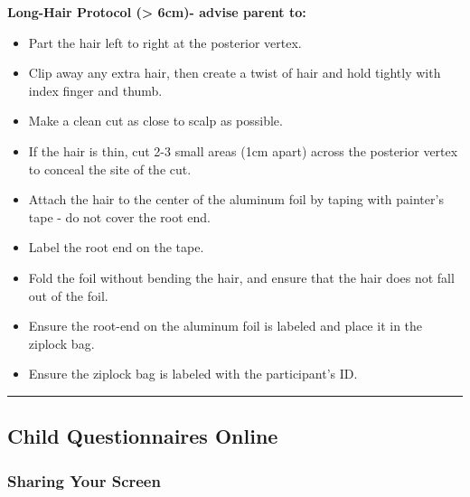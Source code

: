 \documentclass[]{book}
\providecommand{\tightlist}{%
  \setlength{\itemsep}{0pt}\setlength{\parskip}{0pt}}
\begin{document}
\textbf{Long-Hair Protocol (\textgreater{} 6cm)- advise parent to:}

\begin{itemize}
\tightlist
\item
  Part the hair left to right at the posterior vertex.
\item
  Clip away any extra hair, then create a twist of hair and hold tightly with index finger and thumb.
\item
  Make a clean cut as close to scalp as possible.
\item
  If the hair is thin, cut 2-3 small areas (1cm apart) across the posterior vertex to conceal the site of the cut.
\item
  Attach the hair to the center of the aluminum foil by taping with painter's tape - do not cover the root end.
\item
  Label the root end on the tape.
\item
  Fold the foil without bending the hair, and ensure that the hair does not fall out of the foil.
\item
  Ensure the root-end on the aluminum foil is labeled and place it in the ziplock bag.
\item
  Ensure the ziplock bag is labeled with the participant's ID.
\end{itemize}

\begin{center}\rule{0.5\linewidth}{0.5pt}\end{center}

\hypertarget{child-questionnaires-online}{%
\subsection{Child Questionnaires Online}\label{child-questionnaires-online}}

\hypertarget{sharing-your-screen}{%
\subsubsection{Sharing Your Screen}\label{sharing-your-screen}}
\end{document}
